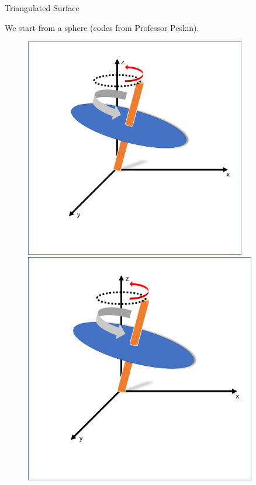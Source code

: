 \documentclass[10pt]{beamer}
\begin{document}
\begin{frame}{Triangulated Surface}

We start from a sphere (codes from Professor Peskin).

\begin{figure}[h]
	\begin{minipage}{0.48\textwidth}
		\centering
		\includegraphics[width=0.86\textwidth]{sphere1.png}
	\end{minipage}
	\begin{minipage}{0.48\textwidth}
		\centering
		\includegraphics[width=0.9\textwidth]{sphere1.png}
	\end{minipage}
\end{figure}


\end{frame}
\end{document}

